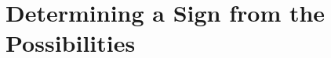 \chapter{Determining a Sign from the Possibilities}
\ifpdf
    \graphicspath{{Chapter3/Chapter3Figs/PNG/}{Chapter3/Chapter3Figs/PDF/}{Chapter3/Chapter3Figs/}}
\else
    \graphicspath{{Chapter3/Chapter3Figs/EPS/}{Chapter3/Chapter3Figs/}}
\fi



